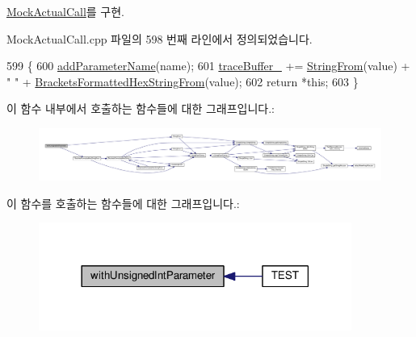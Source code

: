 \hyperlink{class_mock_actual_call_ae3c79cfced5998c3e4d1381fa78d9cff}{Mock\+Actual\+Call}를 구현.



Mock\+Actual\+Call.\+cpp 파일의 598 번째 라인에서 정의되었습니다.


\begin{DoxyCode}
599 \{
600     \hyperlink{class_mock_actual_call_trace_a6957aad0b7b247737e33be49594bf5c9}{addParameterName}(name);
601     \hyperlink{class_mock_actual_call_trace_ab139777fb0949c9d0fbdb4d8b2e63351}{traceBuffer\_} += \hyperlink{_simple_string_8h_a195ee4ca8d909f9ebf37e963d4564446}{StringFrom}(value) + \textcolor{stringliteral}{" "} + 
      \hyperlink{_simple_string_8h_a79aff9fc6d44ba7c6f3dc9dc764c476a}{BracketsFormattedHexStringFrom}(value);
602     \textcolor{keywordflow}{return} *\textcolor{keyword}{this};
603 \}
\end{DoxyCode}


이 함수 내부에서 호출하는 함수들에 대한 그래프입니다.\+:
\nopagebreak
\begin{figure}[H]
\begin{center}
\leavevmode
\includegraphics[width=350pt]{class_mock_actual_call_trace_a2da305b889ee810e2f7bb4c709f4c29c_cgraph}
\end{center}
\end{figure}




이 함수를 호출하는 함수들에 대한 그래프입니다.\+:
\nopagebreak
\begin{figure}[H]
\begin{center}
\leavevmode
\includegraphics[width=290pt]{class_mock_actual_call_trace_a2da305b889ee810e2f7bb4c709f4c29c_icgraph}
\end{center}
\end{figure}



